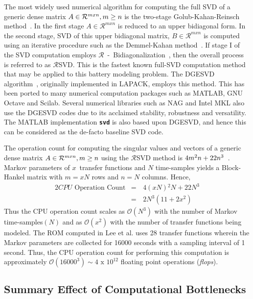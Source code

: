 The most widely used numerical algorithm for computing the full SVD
of a generic dense matrix $\mbox{\ensuremath{A\in\mathcal{R}^{mxn},m\geq n}}$
is the two-stage Golub-Kahan-Reinsch method~\citep{GolubVanLoan2012}.
In the first stage $A\in\mathcal{R}^{mxn}$ is reduced to an upper
bidiagonal form. In the second stage, SVD of this upper bidiagonal
matrix, $B\in\mathcal{R}^{mxn}$ is computed using an iterative procedure
such as the Demmel-Kahan method~\citep{GolubVanLoan2012}. If stage
I of the SVD computation employs $\mathcal{R}$~-~Bidiagonalization~\citep{GolubVanLoan2012},
then the overall process is referred to as $\mathcal{R}$\textminus SVD.
This is the fastest known full-SVD computation method that may be
applied to this battery modeling problem. The \textsc{DGESVD} algorithm~\citep{AndersonBaiBischofEtAl2012},
originally implemented in LAPACK, employs this method. This has been
ported to many numerical computation packages such as MATLAB, GNU
Octave and Scilab. Several numerical libraries such as NAG and Intel
MKL also use the DGESVD codes due to its acclaimed stability, robustness
and versatility. The MATLAB implementation \texttt{\textbf{svd}} is
also based upon DGESVD, and hence this can be considered as the de-facto
baseline SVD code.

The operation count for computing the singular values and vectors
of a generic dense matrix $\mbox{\ensuremath{A\in\mathcal{R}^{mxn},m\geq n}}$
using the $\mathcal{R}$\textminus SVD method is $\mbox{\ensuremath{4m^{2}n+22n^{3}}}$~\citep{GolubVanLoan2012}.
Markov parameters of $x$~transfer functions and $N$ time-samples
yields a Block-Hankel matrix with $m=xN$ rows and $n=N$ columns.
Hence,
\begin{alignat}{2}
CPU\text{ Operation Count} & = & \,4\left(xN\right){}^{2}N+22N^{3}\nonumber \\
& = & \,2N^{3}\left(11+2x^{2}\right)\label{eq:cpu_op_count}
\end{alignat}
Thus the CPU operation count scales as $\mathcal{O}(N^{3})$
with the number of Markov time-samples$\left(N\right)$ and as $\mathcal{O}(x^{2})$
with the number of transfer functions being modeled. The ROM computed
in Lee et al. uses 28 transfer functions wherein the Markov parameters
are collected for 16000 seconds with a sampling interval of 1 second.
Thus, the CPU operation count for performing this computation is approximately
$\mathcal{O}(16000^{3})\sim4\text{ x }10^{12}$ floating point operations
(\textit{flops}).

\subsection{Summary Effect of Computational Bottlenecks\label{subsec:Summary-Effect-of}}

